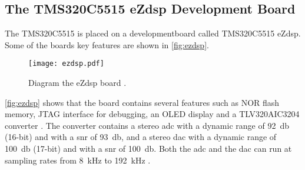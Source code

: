 \subsection{The TMS320C5515 eZdsp Development Board}
The TMS320C5515 is placed on a developmentboard called TMS320C5515 eZdsp. Some of the boards key features are shown in \autoref{fig:ezdsp}.
\begin{figure}[htbp!]
    \centering
        \texttt{[image: ezdsp.pdf]}
        \caption{Diagram the eZdsp board \citep{ezdsp}.}
        \label{fig:ezdsp}
  \end{figure}
\autoref{fig:ezdsp} shows that the board contains several features such as NOR flash memory, JTAG interface for debugging, an OLED display and a TLV320AIC3204 converter \citep{ezdsp}.  
The converter contains a stereo \gls{adc} with a dynamic range of \SI{92}{\decibel} (16-bit) and with a \gls{snr} of \SI{93}{\decibel}, and a stereo \gls{dac} with a dynamic range of \SI{100}{\decibel} (17-bit) and with a \gls{snr} of \SI{100}{\decibel}. Both the \gls{adc} and the \gls{dac} can run at sampling rates from \SI{8}{\kilo\hertz} to \SI{192}{\kilo\hertz} \citep{TLV320AIC3204}.
